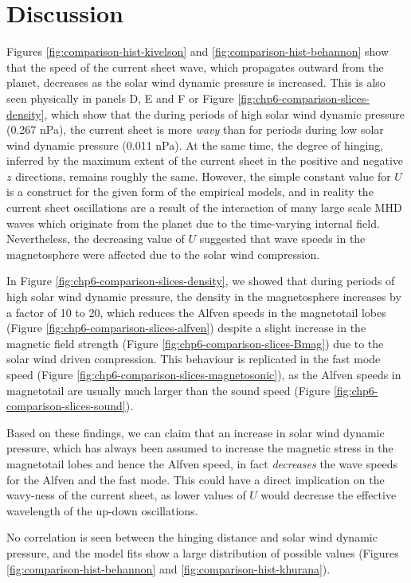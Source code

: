\section{Discussion}

Figures \ref{fig:comparison-hist-kivelson} and \ref{fig:comparison-hist-behannon} show that the speed of the current sheet wave, which propagates outward from the planet, decreases as the solar wind dynamic pressure is increased. This is also seen physically in panels D, E and F or Figure \ref{fig:chp6-comparison-slices-density}, which show that the during periods of high solar wind dynamic pressure (0.267 nPa), the current sheet is more \emph{wavy} than for periods during low solar wind dynamic pressure (0.011 nPa). At the same time, the degree of hinging, inferred by the maximum extent of the current sheet in the positive and negative $z$ directions, remains roughly the same. However, the simple constant value for $U$ is a construct for the given form of the empirical models, and in reality the current sheet oscillations are a result of the interaction of many large scale MHD waves which originate from the planet due to the time-varying internal field. Nevertheless, the decreasing value of $U$ suggested that wave speeds in the magnetosphere were affected due to the solar wind compression. 

In Figure \ref{fig:chp6-comparison-slices-density}, we showed that during periods of high solar wind dynamic pressure, the density in the magnetosphere increases by a factor of 10 to 20, which reduces the Alfven speeds in the magnetotail lobes (Figure \ref{fig:chp6-comparison-slices-alfven}) despite a slight increase in the magnetic field strength (Figure \ref{fig:chp6-comparison-slices-Bmag}) due to the solar wind driven compression. This behaviour is replicated in the fast mode speed (Figure \ref{fig:chp6-comparison-slices-magnetosonic}), as the Alfven speeds in magnetotail are usually much larger than the sound speed (Figure \ref{fig:chp6-comparison-slices-sound}). 

Based on these findings, we can claim that an increase in solar wind dynamic pressure, which has always been assumed to increase the magnetic stress in the magnetotail lobes and hence the Alfven speed, in fact \emph{decreases} the wave speeds for the Alfven and the fast mode. This could have a direct implication on the wavy-ness of the current sheet, as lower values of $U$ would decrease the effective wavelength of the up-down oscillations. 

No correlation is seen between the hinging distance and solar wind dynamic pressure, and the model fits show a large distribution of possible values (Figures \ref{fig:comparison-hist-behannon} and \ref{fig:comparison-hist-khurana}). 

